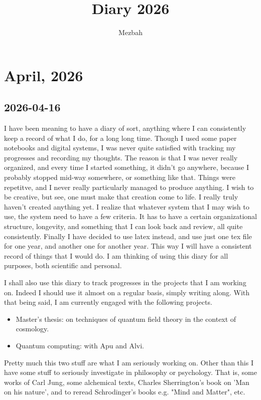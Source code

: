 \documentclass[11pt,a4paper]{article}
\title{Diary 2026}
\author{Mezbah}
\date{}
\begin{document}
\maketitle
\tableofcontents 

\newpage

\section{April, 2026}

\subsection{2026-04-16}
I have been meaning to have a diary of sort, anything where I can consistently keep a record of what I do, for a long long time. Though I used some paper notebooks and digital systems, I was never quite satisfied with tracking my progresses and recording my thoughts. The reason is that I was never really organized, and every time I started something, it didn't go anywhere, because I probably stopped mid-way somewhere, or something like that. Things were repetitve, and I never really particularly managed to produce anything. I wish to be creative, but see, one must make that creation come to life. I really truly haven't created anything yet. I realize that whatever system that I may wish to use, the system need to have a few criteria. It has to have a certain organizational structure, longevity, and something that I can look back and review, all quite consistently. Finally I have decided to use latex instead, and use just one tex file for one year, and another one for another year. This way I will have a consistent record of things that I would do. I am thinking of using this diary for all purposes, both scientific and personal. 

I shall also use this diary to track progresses in the projects that I am working on. Indeed I should use it almost on a regular basis, simply writing along. With that being said, I am currently engaged with the following projects. 

\begin{itemize}
	\item Master's thesis: on techniques of quantum field theory in the context of cosmology. 
	
	\item Quantum computing: with Apu and Alvi. 
\end{itemize}
Pretty much this two stuff are what I am seriously working on. Other than this I have some stuff to seriously investigate in philosophy or psychology. That is, some works of Carl Jung, some alchemical texts, Charles Sherrington's book on 'Man on his nature', and to reread Schrodinger's books e.g. "Mind and Matter", etc. 
\end{document}
